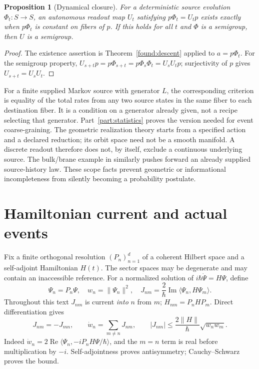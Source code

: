 \documentclass[11pt,oneside,openany]{book}
\newtheorem{proposition}[theorem]{Proposition}
\theoremstyle{definition}
\theoremstyle{remark}\newtheorem{remark}[theorem]{Remark}
\begin{document}
\begin{proposition}[Dynamical closure]\label{found:closure}
For a deterministic source evolution $\Phi_t:S\to S$, an autonomous readout map $U_t$ satisfying $p\Phi_t=U_tp$ exists exactly when $p\Phi_t$ is constant on fibers of $p$. If this holds for all $t$ and $\Phi$ is a semigroup, then $U$ is a semigroup.
\end{proposition}
\begin{proof}
The existence assertion is Theorem~\ref{found:descent} applied to $a=p\Phi_t$. For the semigroup property, $U_{s+t}p=p\Phi_{s+t}=p\Phi_s\Phi_t=U_sU_tp$; surjectivity of $p$ gives $U_{s+t}=U_sU_t$.
\end{proof}

For a finite supplied Markov source with generator $L$, the corresponding criterion is equality of the total rates from any two source states in the same fiber to each destination fiber. It is a condition on a generator already given, not a recipe selecting that generator. Part~\ref{part:statistics} proves the version needed for event coarse-graining. The geometric realization theory \cite{F04} starts from a specified action and a declared reduction; its orbit space need not be a smooth manifold. A discrete readout therefore does not, by itself, exclude a continuous underlying source. The bulk/brane example in \cite{F07} similarly pushes forward an already supplied source-history law. These scope facts prevent geometric or informational incompleteness from silently becoming a probability postulate.

\section{Hamiltonian current and actual events}
Fix a finite orthogonal resolution $(P_n)_{n=1}^d$ of a coherent Hilbert space and a self-adjoint Hamiltonian $H(t)$. The sector spaces may be degenerate and may contain an inaccessible reference. For a normalized solution of $i\hbar\dot\Psi=H\Psi$, define
\begin{equation}\label{found:current}
 \Psi_n=P_n\Psi,\quad w_n=\|\Psi_n\|^2,\quad
 J_{nm}=\frac{2}{\hbar}\operatorname{Im}\langle\Psi_n,H\Psi_m\rangle.
\end{equation}
Throughout this text $J_{nm}$ is current \emph{into} $n$ from $m$; $H_{nm}=P_nHP_m$. Direct differentiation gives
\begin{equation}\label{found:continuity}
 J_{nm}=-J_{mn},\qquad \dot w_n=\sum_{m\ne n}J_{nm},\qquad
 |J_{nm}|\le\frac{2\|H\|}{\hbar}\sqrt{w_nw_m}.
\end{equation}
Indeed $\dot w_n=2\operatorname{Re}\langle\Psi_n,-iP_nH\Psi/\hbar\rangle$, and the $m=n$ term is real before multiplication by $-i$. Self-adjointness proves antisymmetry; Cauchy--Schwarz proves the bound.
\end{document}
